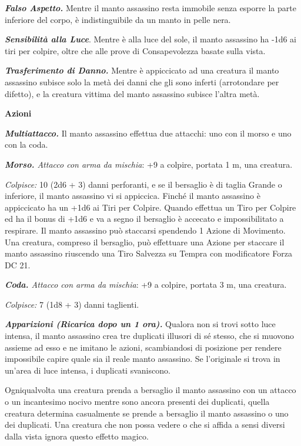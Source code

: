 \begin{multicols}{2}
{\emph{\textbf{Falso Aspetto.}} Mentre il manto assassino resta immobile senza esporre la parte inferiore del corpo, è indistinguibile da un manto in pelle nera.

\emph{\textbf{Sensibilità alla Luce}}. Mentre è alla luce del sole, il manto assassino ha -1d6 ai tiri per colpire, oltre che alle prove di Consapevolezza basate sulla vista.

\emph{\textbf{Trasferimento di Danno.}} Mentre è appiccicato ad una creatura il manto assassino subisce solo la metà dei danni che gli sono inferti (arrotondare per difetto), e la creatura vittima del manto assassino subisce l'altra metà.

\textbf{Azioni}

\emph{\textbf{Multiattacco.}} Il manto assassino effettua due attacchi: uno con il morso e uno con la coda.

\emph{\textbf{Morso.} Attacco con arma da mischia}: +9 a colpire, portata 1 m, una creatura.

\emph{Colpisce:} 10 (2d6 + 3) danni perforanti, e se il bersaglio è di taglia Grande o inferiore, il manto assassino vi si appiccica.
Finché il manto assassino è appiccicato ha un +1d6 ai Tiri per Colpire. Quando effettua un Tiro per Colpire ed ha il bonus di +1d6 e va a segno il bersaglio è accecato e impossibilitato a respirare. Il manto assassino può staccarsi spendendo 1 Azione di Movimento. Una creatura, compreso il bersaglio, può effettuare una Azione per staccare il manto assassino riuscendo una Tiro Salvezza su Tempra con modificatore Forza DC 21.

\emph{\textbf{Coda.} Attacco con arma da mischia}: +9 a colpire, portata 3 m, una creatura.

\emph{Colpisce:} 7 (1d8 + 3) danni taglienti.

\emph{\textbf{Apparizioni (Ricarica dopo un 1 ora).}} Qualora non si trovi sotto luce intensa, il manto assassino crea tre duplicati illusori di sé stesso, che si muovono assieme ad esso e ne imitano le azioni, scambiandosi di posizione per rendere impossibile capire quale sia il reale manto assassino. Se l'originale si trova in un'area di luce intensa, i duplicati svaniscono.

Ogniqualvolta una creatura prenda a bersaglio il manto assassino con un attacco o un incantesimo nocivo mentre sono ancora presenti dei duplicati, quella creatura determina casualmente se prende a bersaglio il manto assassino o uno dei duplicati. Una creatura che non possa vedere o che si affida a sensi diversi dalla vista ignora questo effetto magico.

}
\end{multicols}
